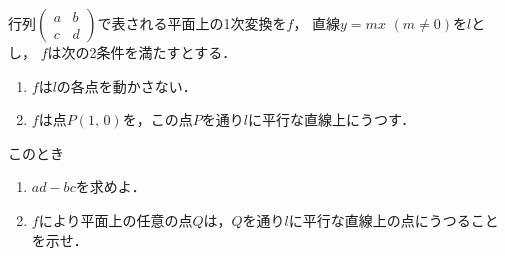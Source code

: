 \documentclass[../../main.tex]{subfiles}
\begin{document}
行列$
\begin{pmatrix} a & b \\ c & d
\end{pmatrix}$で表される平面上の1次変換を$f$，
直線$y=mx$ $(m\neq0)$を$l$とし，
$f$は次の2条件を満たすとする．
\begin{enumerate}
  \item $f$は$l$の各点を動かさない．
  \item $f$は点$P(1, \, 0)$を，この点$P$を通り$l$に平行な直線上にうつす．
\end{enumerate}
このとき
\begin{enumerate}
  \item $ad-bc$を求めよ．
  \item $f$により平面上の任意の点$Q$は，$Q$を通り$l$に平行な直線上の点にうつることを示せ．
\end{enumerate}
\end{document}
